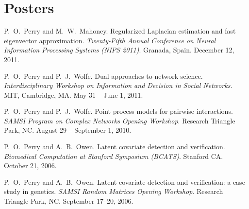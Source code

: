 \documentclass[10pt,letterpaper]{article}
\renewenvironment{itemize}{
  \begin{list}{}{
    \setlength{\leftmargin}{1.5em}
    \setlength{\itemsep}{0.25em}
    \setlength{\parskip}{0pt}
    \setlength{\parsep}{0.25em}
  }
}{
  \end{list}
}
\begin{document}
\section*{Posters}
\begin{itemize}
\item P.~O.~Perry and M.~W.~Mahoney.
  Regularized Laplacian estimation and fast eigenvector approximation.
  \textit{Twenty-Fifth Annual Conference on Neural Information Processing Systems (NIPS 2011)}.
  Granada, Spain.
  December 12, 2011.

\item P.~O.~Perry and P.~J.~Wolfe.
  Dual approaches to network science.
  \textit{Interdisciplinary Workshop on Information and Decision in Social Networks}.
  MIT, Cambridge, MA.
  May 31 -- June 1, 2011.

\item P.~O.~Perry and P.~J.~Wolfe.
  Point process models for pairwise interactions.
  \textit{SAMSI Program on Complex Networks Opening Workshop}.
  Research Triangle Park, NC.
  August 29 -- September 1, 2010.

\item P.~O.~Perry and A.~B.~Owen.
  Latent covariate detection and verification.
  \textit{Biomedical Computation at Stanford Symposium (BCATS)}.
  Stanford CA.
  October 21, 2006.

\item P.~O.~Perry and A.~B.~Owen.
  Latent covariate detection and verification: a case study in genetics.
  \textit{SAMSI Random Matrices Opening Workshop}.
  Research Triangle Park, NC.
  September 17--20, 2006.
\end{itemize}
\end{document}
